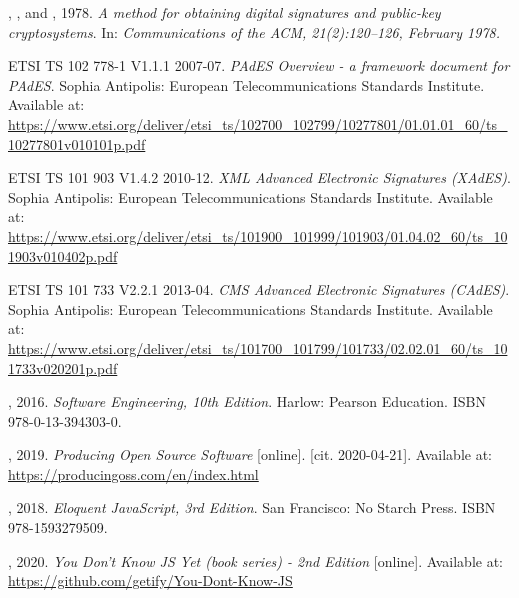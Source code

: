 \documentclass[thesismargins, english, thesislinespacing, onelinechapterstyle, upjsfrontpage]{rnthesis}
\begin{document}
\begin{thebibliography}{9}
  , , and , 1978. \emph{A method for obtaining digital signatures and public-key cryptosystems}. In: \emph{Communications of the ACM, 21(2):120–126, February 1978.}

  ETSI TS 102 778-1 V1.1.1 2007-07. \emph{PAdES Overview - a framework document for PAdES}. Sophia Antipolis: European Telecommunications Standards Institute. Available at: \url{https://www.etsi.org/deliver/etsi_ts/102700_102799/10277801/01.01.01_60/ts_10277801v010101p.pdf}

  ETSI TS 101 903 V1.4.2 2010-12. \emph{XML Advanced Electronic Signatures (XAdES)}. Sophia Antipolis: European Telecommunications Standards Institute. Available at: \url{https://www.etsi.org/deliver/etsi_ts/101900_101999/101903/01.04.02_60/ts_101903v010402p.pdf}

  ETSI TS 101 733 V2.2.1 2013-04. \emph{CMS Advanced Electronic Signatures (CAdES)}. Sophia Antipolis: European Telecommunications Standards Institute. Available at: \url{https://www.etsi.org/deliver/etsi_ts/101700_101799/101733/02.02.01_60/ts_101733v020201p.pdf}

  , 2016. \emph{Software Engineering, 10th Edition}. Harlow: Pearson Education. ISBN 978-0-13-394303-0.

  , 2019. \emph{Producing Open Source Software} [online]. [cit. 2020-04-21]. Available at: \url{https://producingoss.com/en/index.html}

  , 2018. \emph{Eloquent JavaScript, 3rd Edition}. San Francisco: No Starch Press. ISBN 978-1593279509.

  , 2020. \emph{You Don't Know JS Yet (book series) - 2nd Edition} [online]. Available at: \url{https://github.com/getify/You-Dont-Know-JS}


\end{thebibliography}
\end{document}
